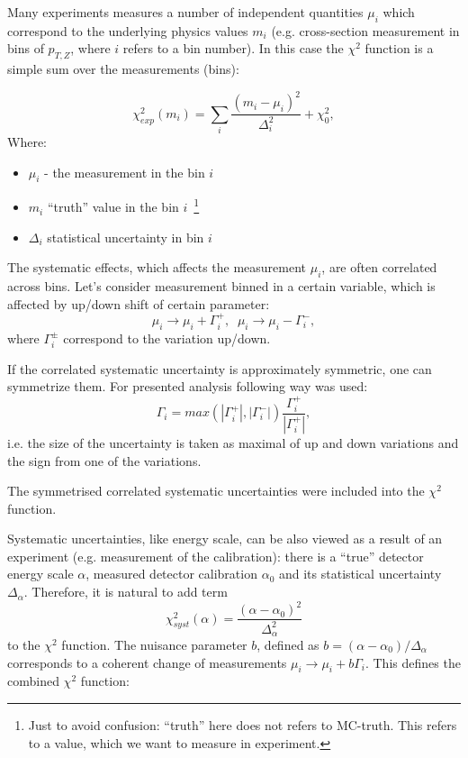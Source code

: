 Many experiments measures a number of independent quantities $\mu_i$ which correspond to the underlying physics values $m_i$ (e.g. cross-section measurement in bins of $p_{T,Z}$, where $i$ refers to a bin number). In this case the $\chi^2$ function is a simple sum over the
measurements (bins):

\begin{equation}
  \chi^{2}_{exp}(m_i)= \sum_i \frac{ ( m_i-\mu_i )^{2}}{\Delta^{2}_i} + \chi^2_0,
  \label{Eq:ChiExp}
\end{equation}
Where:
\begin{itemize}
\item $\mu_i$ - the measurement in the bin $i$
\item $m_i$ ``truth'' value in the bin $i$~\footnote{Just to avoid confusion: ``truth'' here does not refers to MC-truth. This refers to a value, which we want to measure in experiment.}
\item $\Delta_i$ statistical uncertainty in bin $i$
\end{itemize}

The systematic effects, which affects the measurement $\mu_i$, are often correlated across bins. Let's consider measurement binned in a certain variable, which is affected by up/down shift of certain parameter:
\begin{equation}
  \mu_i \to \mu_i + \Gamma_i^+, \; \; \mu_i \to \mu_i - \Gamma_i^-, 
  \label{Eq:Systematics}
\end{equation}
where $\Gamma^{\pm}_i$ correspond to the variation up/down.

If the correlated systematic uncertainty is approximately symmetric, one can symmetrize them. For presented analysis following way was used:
\begin{equation}
\Gamma_i = max(|\Gamma_i^+|, |\Gamma_i^-|) \frac{\Gamma_i^+}{|\Gamma_i^+|},
  \label{Eq:Symmetrization}
\end{equation}
i.e. the size of the uncertainty is taken as maximal of up and down variations and the sign from one of the variations.

The symmetrised correlated systematic uncertainties were included into the $\chi^2$ function.

Systematic uncertainties, like energy scale, can be also viewed as a result of an experiment (e.g. measurement of the calibration): there is a ``true'' detector energy scale $\alpha$, measured detector calibration $\alpha_0$ and its statistical uncertainty $\Delta_{\alpha}$. Therefore, it is natural to add term
\begin{equation}
\chi^2_{syst}(\alpha) = \frac{(\alpha-\alpha_0)^2}{\Delta_{\alpha}^2}
  \label{Eq:ChiSyst}
\end{equation}
to the $\chi^2$ function. The nuisance parameter $b$, defined as  $b=(\alpha-\alpha_0)/\Delta_{\alpha}$ corresponds to a coherent change of measurements $\mu_i \to \mu_i + b\Gamma_i$. This defines the combined $\chi^2$ function:

